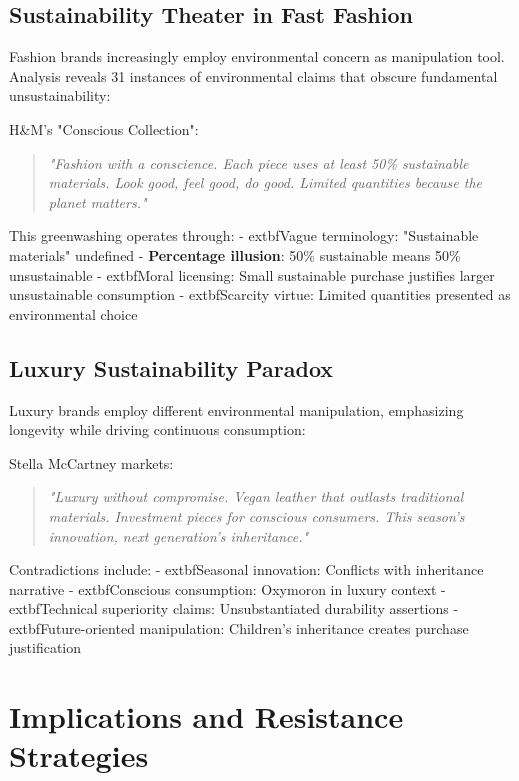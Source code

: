 \subsection{Sustainability Theater in Fast Fashion}

Fashion brands increasingly employ environmental concern as manipulation tool. Analysis reveals 31 instances of environmental claims that obscure fundamental unsustainability:

H&M's "Conscious Collection":
\begin{quote}
\textit{"Fashion with a conscience. Each piece uses at least 50\% sustainable materials. Look good, feel good, do good. Limited quantities because the planet matters."}
\end{quote}

This greenwashing operates through:
- 	extbf{Vague terminology}: "Sustainable materials" undefined
- \textbf{Percentage illusion}: 50\% sustainable means 50\% unsustainable
- 	extbf{Moral licensing}: Small sustainable purchase justifies larger unsustainable consumption
- 	extbf{Scarcity virtue}: Limited quantities presented as environmental choice

\subsection{Luxury Sustainability Paradox}

Luxury brands employ different environmental manipulation, emphasizing longevity while driving continuous consumption:

Stella McCartney markets:
\begin{quote}
\textit{"Luxury without compromise. Vegan leather that outlasts traditional materials. Investment pieces for conscious consumers. This season's innovation, next generation's inheritance."}
\end{quote}

Contradictions include:
- 	extbf{Seasonal innovation}: Conflicts with inheritance narrative
- 	extbf{Conscious consumption}: Oxymoron in luxury context
- 	extbf{Technical superiority claims}: Unsubstantiated durability assertions
- 	extbf{Future-oriented manipulation}: Children's inheritance creates purchase justification

\section{Implications and Resistance Strategies}
\label{sec:fashion_implications}

